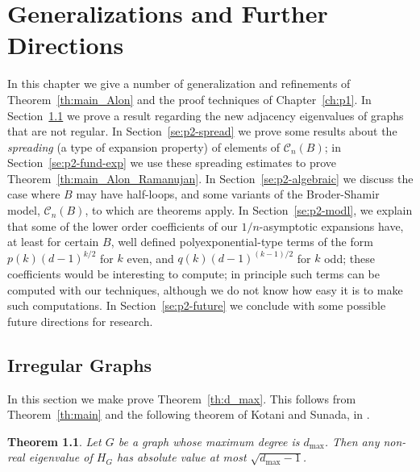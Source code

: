 \documentclass{memo-l}
\theoremstyle{plain}
\newtheorem{theorem}{Theorem}[section]
\theoremstyle{definition}
\numberwithin{section}{chapter}
\numberwithin{equation}{chapter}
\theoremstyle{plain}
\theoremstyle{definition}
\newcommand\cC{\mathcal{C}}
\begin{document}
% 
% 
% 
% 
% 
% 
% 
%
\chapter{Generalizations and Further Directions}
\label{ch:p2}

In this chapter we give a number of generalization and refinements 
of Theorem~\ref{th:main_Alon} and the proof techniques 
of Chapter~\ref{ch:p1}.  
In Section~\ref{se:p2-irregular} we prove a result regarding
the new adjacency eigenvalues of graphs that are not regular.
In Section~\ref{se:p2-spread} we prove some results about the
{\em spreading} (a type of expansion property) of elements of
$\cC_n(B)$;
in Section~\ref{se:p2-fund-exp} we use these spreading estimates
to prove Theorem~\ref{th:main_Alon_Ramanujan}.
In Section~\ref{se:p2-algebraic} we discuss the case where $B$ may have
half-loops, and some variants of the Broder-Shamir model, $\cC_n(B)$, to
which are theorems apply.
In Section~\ref{se:p2-modl}, we explain that some of the 
lower order coefficients
of our $1/n$-asymptotic expansions have, at least for certain $B$,
well defined polyexponential-type terms
of the form $p(k)(d-1)^{k/2}$ for $k$ even, and $q(k)(d-1)^{(k-1)/2}$
for $k$ odd; these coefficients would be interesting to compute;
in principle such terms can be computed with our techniques, although
we do not know how easy it is to make such computations.
In Section~\ref{se:p2-future} we conclude with some possible future
directions for research.





\section{Irregular Graphs}
\label{se:p2-irregular}

In this section we make prove Theorem~\ref{th:d_max}.
This follows from Theorem~\ref{th:main} and the following
theorem of Kotani and Sunada, in \cite{kotani}.

\begin{theorem}
Let $G$ be a graph whose maximum degree is $d_{\max}$.  Then any
non-real eigenvalue of $H_G$ has absolute value at most
$\sqrt{d_{\max}-1}$.
\end{theorem}
\end{document}
